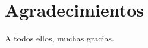 



\chapter*{Agradecimientos}

\thispagestyle{empty} 				%


\blindtext


\vspace{1cm}
A todos ellos, muchas gracias.



{\raggedleft\vfill\itshape{}\par
}

\newpage
$\ $
\thispagestyle{empty}